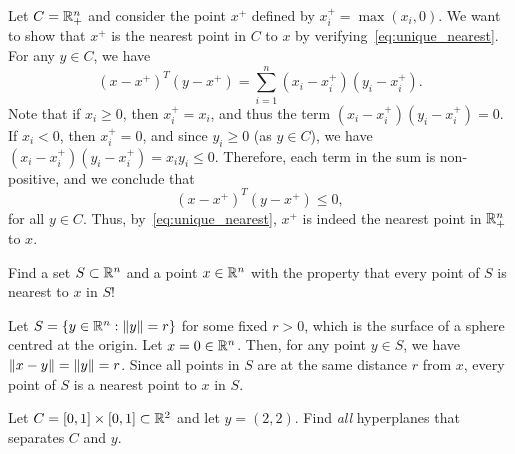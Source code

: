 \begin{solution}
  Let $C = \mathbb{R}^n_+$ and consider the point $x^+$ defined by $x^+_i = \max(x_i, 0)$.
  We want to show that $x^+$ is the nearest point in $C$ to $x$ by verifying~\eqref{eq:unique_nearest}.
  For any $y \in C$, we have
  \begin{equation}
    (x - x^+)^T (y - x^+) = \sum_{i=1}^n (x_i - x^+_i)(y_i - x^+_i).
  \end{equation}
  Note that if $x_i \geq 0$, then $x^+_i = x_i$, and thus the term $(x_i - x^+_i)(y_i - x^+_i) = 0$.
  If $x_i < 0$, then $x^+_i = 0$, and since $y_i \geq 0$ (as $y \in C$), we have $(x_i - x^+_i)(y_i - x^+_i) = x_i y_i \leq 0$.
  Therefore, each term in the sum is non-positive, and we conclude that
  \begin{equation}
    (x - x^+)^T (y - x^+) \leq 0,
  \end{equation}
  for all $y \in C$.
  Thus, by~\eqref{eq:unique_nearest}, $x^+$ is indeed the nearest point in $\mathbb{R}^n_+$ to $x$.
\end{solution}

\begin{exercise}
  Find a set $S \subset \mathbb{R}^n$ and a point $x \in \mathbb{R}^n$ with the property that every point of $S$ is nearest to $x$ in $S$!
\end{exercise}

\begin{solution}
  Let $S = \{ y \in \mathbb{R}^n : \lVert y\rVert = r \}$ for some fixed $r > 0$, which is the surface of a sphere centred at the origin.
  Let $x = 0 \in \mathbb{R}^n$.
  Then, for any point $y \in S$, we have $\lVert x - y\rVert = \lVert y\rVert = r$.
  Since all points in $S$ are at the same distance $r$ from $x$, every point of $S$ is a nearest point to $x$ in $S$.
\end{solution}


\begin{exercise}
  Let $C = [0,1] \times [0,1] \subset \mathbb{R}^2$ and let $y = (2,2)$.
  Find \emph{all} hyperplanes that separates $C$ and $y$.
\end{exercise}


